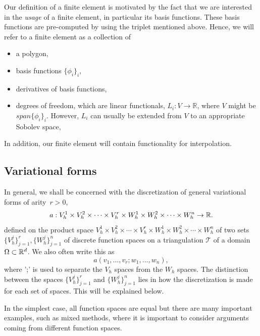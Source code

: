 Our definition of a finite element is motivated by the fact
that we are interested in the \emph{usage} of a finite element, 
in particular its basis functions. These basis functions
are pre-computed by using the triplet mentioned above. 
Hence, we will refer to a finite element as a collection
of 
\begin{itemize}
\item a polygon,  
\item basis functions $\{ \phi_i \}_i$,  
\item derivatives of basis functions,
\item degrees of freedom, which are linear
functionals, $L_i : V \rightarrow \mathbb{R}$, where $V$ might be 
$span\{ \phi_i \}_i$. However, $L_i$ can usually be extended 
from $V$ to an appropriate Sobolev space, 
\end{itemize}
In addition, our finite element will contain functionality
for interpolation. 





\subsection{Variational forms}

In general, we shall be concerned with the discretization of general
variational forms of arity~$r > 0$,
\begin{equation} \label{eq:variationalform}
  a : V_h^1 \times V_h^2 \times \cdots \times V_h^r \times
  W_h^1 \times W_h^2 \times \cdots \times W_h^n \rightarrow \mathbb{R}.
\end{equation}
defined on the product space $V_h^1 \times V_h^2 \times \cdots \times
V_h^r \times W_h^1 \times W_h^2 \times \cdots \times W_h^n$ of two sets
$\{V_h^j\}_{j=1}^r, \{W_h^j\}_{j=1}^n$ of discrete function spaces on
a triangulation $\mathcal{T}$ of a domain $\Omega \subset \mathbb{R}^d$. 
We also often write this as 
\begin{equation}
a(v_1, \ldots, v_r; w_1, \ldots, w_n), 
\end{equation}
where ';' is used to separate the $V_h$ spaces from the $W_h$ spaces. 
The distinction between the spaces $\{V_h^j\}_{j=1}^r$ and
$\{W_h^j\}_{j=1}^n$ lies in how the discretization is made for each
set of spaces. This will be explained below.



In
the simplest case, all function spaces are equal but there are many
important examples, such as mixed methods, where it is important to
consider arguments coming from different function spaces. 





